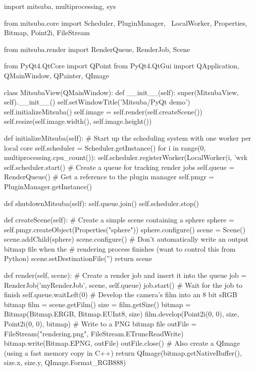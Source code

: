 \begin{python}
import mitsuba, multiprocessing, sys

from mitsuba.core import Scheduler, PluginManager, \
    LocalWorker, Properties, Bitmap, Point2i, FileStream

from mitsuba.render import RenderQueue, RenderJob, Scene

from PyQt4.QtCore import QPoint
from PyQt4.QtGui import QApplication, QMainWindow, QPainter, QImage

class MitsubaView(QMainWindow):
    def __init__(self):
        super(MitsubaView, self).__init__()
        self.setWindowTitle('Mitsuba/PyQt demo')
        self.initializeMitsuba()
        self.image = self.render(self.createScene())
        self.resize(self.image.width(), self.image.height())

    def initializeMitsuba(self):
        # Start up the scheduling system with one worker per local core
        self.scheduler = Scheduler.getInstance()
        for i in range(0, multiprocessing.cpu_count()):
            self.scheduler.registerWorker(LocalWorker(i, 'wrk%
        self.scheduler.start()
        # Create a queue for tracking render jobs
        self.queue = RenderQueue()
        # Get a reference to the plugin manager
        self.pmgr = PluginManager.getInstance()

    def shutdownMitsuba(self):
        self.queue.join()
        self.scheduler.stop()

    def createScene(self):
        # Create a simple scene containing a sphere
        sphere = self.pmgr.createObject(Properties("sphere"))
        sphere.configure()
        scene = Scene()
        scene.addChild(sphere)
        scene.configure()
        # Don't automatically write an output bitmap file when the
        # rendering process finishes (want to control this from Python)
        scene.setDestinationFile('')
        return scene

    def render(self, scene):
        # Create a render job and insert it into the queue
        job = RenderJob('myRenderJob', scene, self.queue)
        job.start()
        # Wait for the job to finish
        self.queue.waitLeft(0)
        # Develop the camera's film into an 8 bit sRGB bitmap
        film = scene.getFilm()
        size = film.getSize()
        bitmap = Bitmap(Bitmap.ERGB, Bitmap.EUInt8, size)
        film.develop(Point2i(0, 0), size, Point2i(0, 0), bitmap)
        # Write to a PNG bitmap file
        outFile = FileStream("rendering.png", FileStream.ETruncReadWrite)
        bitmap.write(Bitmap.EPNG, outFile)
        outFile.close()
        # Also create a QImage (using a fast memory copy in C++)
        return QImage(bitmap.getNativeBuffer(),
            size.x, size.y, QImage.Format_RGB888)


\end{python}
